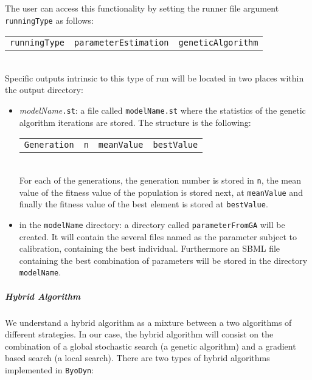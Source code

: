 \documentclass[a4paper, 11pt]{article}
\begin{document}
The user can access this functionality by setting the runner file argument \texttt{runningType} as follows:\\[1.5ex]
\begin{tabular}{ccc}\texttt{runningType}&\texttt{parameterEstimation}&\texttt{geneticAlgorithm}\end{tabular}\\[1.5ex]
Specific outputs intrinsic to this type of run will be located in two places within the output directory:
\begin{itemize}
\item \textit{modelName}\texttt{.st}: a file called \texttt{modelName.st} where the statistics of the genetic algorithm iterations are stored.
The structure is the following:\\[1.5ex]
\begin{tabular}{cccc}\texttt{Generation}&\texttt{n}&\texttt{meanValue}&\texttt{bestValue}\end{tabular}\\[1.5ex]
For each of the generations, the generation number is stored in \texttt{n}, the mean value of the fitness value of the population is stored next, at \texttt{meanValue} and finally the fitness value of the best element is stored at \texttt{bestValue}.
\item in the \texttt{modelName} directory: a directory called \texttt{parameterFromGA} will be created. It will contain the several files named as the parameter subject to calibration, containing the best individual.
Furthermore an SBML file containing the best combination of parameters will be stored in the directory \texttt{modelName}.
\end{itemize}
\subparagraph{Hybrid Algorithm}\label{hybridAlgorithm}
We understand a hybrid algorithm as a mixture between a two algorithms of different strategies.
In our case, the hybrid algorithm will consist on the combination of a global stochastic search (a genetic algorithm) and a gradient based search (a local search).
There are two types of hybrid algorithms implemented in \texttt{ByoDyn}:
\end{document}
